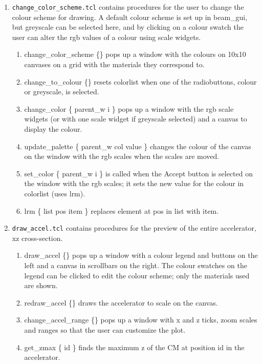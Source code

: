 \documentclass[12pt]{book}
\begin{document}
\begin{enumerate}
\item {\tt change\_color\_scheme.tcl} contains procedures for the user
to change the colour scheme for drawing.  A default colour scheme is set
up in beam\_gui, but greyscale can be selected here, and by clicking on
a colour swatch the user can alter the rgb values of a colour using
scale widgets.
\begin{enumerate}
\item {\sf change\_color\_scheme \{\}} pops up a window with the colours
on 10x10 canvases on a grid with the materials they correspond to.
\item {\sf change\_to\_colour \{\}} resets colorlist when one of the
radiobuttons, colour or greyscale, is selected.
\item {\sf change\_color \{ parent\_w i \}} pops up a window with the
rgb scale widgets (or with one scale widget if greyscale selected) and a
canvas to display the colour.
\item {\sf update\_palette \{ parent\_w col value \}} changes the colour
of the canvas on the window with the rgb scales when the scales are moved.
\item {\sf set\_color \{ parent\_w i \}} is called when the Accept button
is selected on the window with the rgb scales; it sets the new value for
the colour in colorlist (uses lrm).
\item {\sf lrm \{ list pos item \}} replaces element at pos in list with
item.
\end{enumerate}

\item {\tt draw\_accel.tcl} contains procedures for the preview of the
entire accelerator, xz cross-section.
\begin{enumerate}
\item {\sf draw\_accel \{\}} pops up a window with a colour legend and
buttons on the left and a canvas in scrollbars on the right.  The colour
swatches on the legend can be clicked to edit the colour scheme; only
the materials used are shown.
\item {\sf redraw\_accel \{\}} draws the accelerator to scale on the
canvas.
\item {\sf change\_accel\_range \{\}} pops up a window with x and z
ticks, zoom scales and ranges so that the user can customize the plot.
\item {\sf get\_zmax \{ id \}} finds the maximum z of the CM at position
id in the accelerator.
\end{enumerate}


\end{enumerate}
\end{document}
